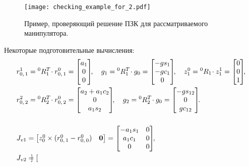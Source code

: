 \begin{figure}[h!]
    \centering\texttt{[image: checking\_example\_for\_2.pdf]}
    \vspace{0.2cm}
    \caption{Пример, проверяющий решение ПЗК для рассматриваемого манипулятора.}
    \label{img_checking_example_for_2}
\end{figure}

Некоторые подготовительные вычисления:
\begin{align}
    & r^1_{0,\,1} = {}^0R_1^T \!\cdot r^0_{0,\,1} =
    \begin{bmatrix}
        a_1 \\ 0 \\ 0
    \end{bmatrix}\!\!,
    \quad
    g_1 = {}^0R_1^T \!\cdot g_0 =
    \begin{bmatrix}
        -g s_1 \\ -g c_1 \\ 0
    \end{bmatrix}\!\!,
    \quad
    z^0_1 = {}^0R_1 \!\cdot z^1_1 =
    \begin{bmatrix}
        0 \\ 0 \\ 1
    \end{bmatrix}\!\!,
    \\
    & r^2_{0,\,2} = {}^0R_2^T \!\cdot r^0_{0,\,2} =
    \begin{bmatrix}
        a_2 + a_1 c_2 \\ 0 \\ a_1 s_2
    \end{bmatrix}\!\!,
    \quad
    g_2 = {}^0R_2^T \!\cdot g_0 =
    \begin{bmatrix}
        -g s_{12} \\ 0 \\ g c_{12}
    \end{bmatrix}\!\!\ldotp
    \\[0.5cm]
    & J_{v1} =
    \begin{bmatrix}
        z^0_0 \times (r^0_{0,\,1} - r^0_{0,\,0}) & \mathbf{0}
    \end{bmatrix}
    =
    \begin{bmatrix}
        -a_1 s_1 & 0 \\
        a_1 c_1 & 0 \\
        0 & 0
    \end{bmatrix}\!\!,
    \\
    & J_{v2} =
    \begin{bmatrix}

\end{bmatrix}
\end{align}
